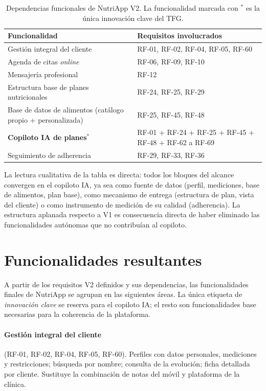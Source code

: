 \begin{table}[htbp]
\centering
\small
\begin{tabular}{|p{5cm}|p{8.5cm}|}
\hline
\textbf{Funcionalidad} & \textbf{Requisitos involucrados} \\
\hline
Gestión integral del cliente & RF-01, RF-02, RF-04, RF-05, RF-60 \\
\hline
Agenda de citas \textit{online} & RF-06, RF-09, RF-10 \\
\hline
Mensajería profesional & RF-12 \\
\hline
Estructura base de planes nutricionales & RF-24, RF-25, RF-29 \\
\hline
Base de datos de alimentos (catálogo propio + personalizada) & RF-25, RF-45, RF-48 \\
\hline
\textbf{Copiloto IA de planes}$^*$ & RF-01 + RF-24 + RF-25 + RF-45 + RF-48 + RF-62 a RF-69 \\
\hline
Seguimiento de adherencia & RF-29, RF-33, RF-36 \\
\hline
\end{tabular}
\caption{Dependencias funcionales de NutriApp V2. La funcionalidad marcada con $^*$ es la única innovación clave del TFG.}
\label{tab:dependencias}
\end{table}

La lectura cualitativa de la tabla es directa: todos los bloques del alcance convergen en el copiloto IA, ya sea como fuente de datos (perfil, mediciones, base de alimentos, plan base), como mecanismo de entrega (estructura de plan, vista del cliente) o como instrumento de medición de su calidad (adherencia). La estructura aplanada respecto a V1 es consecuencia directa de haber eliminado las funcionalidades autónomas que no contribuían al copiloto.


\section{Funcionalidades resultantes}
\label{sec:funcionalidades}

A partir de los requisitos V2 definidos y sus dependencias, las funcionalidades finales de NutriApp se agrupan en las siguientes áreas. La única etiqueta de \textit{innovación clave} se reserva para el copiloto IA; el resto son funcionalidades base necesarias para la coherencia de la plataforma.

\paragraph{Gestión integral del cliente} (RF-01, RF-02, RF-04, RF-05, RF-60). Perfiles con datos personales, mediciones y restricciones; búsqueda por nombre; consulta de la evolución; ficha detallada por cliente. Sustituye la combinación de notas del móvil y plataforma de la clínica.

